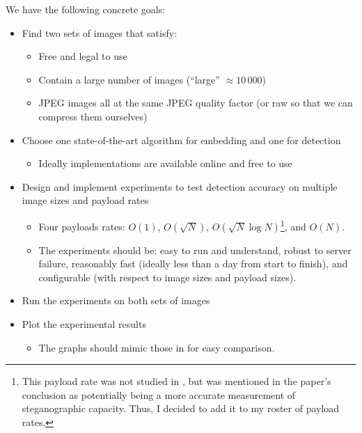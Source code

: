 \documentclass[11pt,a4paper,twoside,openright]{report}
\begin{document}
We have the following concrete goals:
\begin{itemize}

	\item Find two sets of images that satisfy:
		\begin{itemize}
			\item Free and legal to use
			\item Contain a large number of images (``large'' $\approx 10\,000$)
			\item JPEG images all at the same JPEG quality factor (or raw so that we can compress them ourselves)
		\end{itemize}

	\item Choose one state-of-the-art algorithm for embedding and one for detection
		\begin{itemize}
			\item Ideally implementations are available online and free to use
		\end{itemize}

	\item Design and implement experiments to test detection accuracy on multiple image sizes and payload rates
		\begin{itemize}
			\item Four payloads rates: $O(1)$, $O(\sqrt{N})$, $O(\sqrt{N} \log{N})$\footnote{This payload rate was not studied in \cite{2008-paper}, but was mentioned in the paper's conclusion as potentially being a more accurate measurement of steganographic capacity. Thus, I decided to add it to my roster of payload rates.}, and $O(N)$.
			\item The experiments should be: easy to run and understand, robust to server failure, reasonably fast (ideally less than a day from start to finish), and configurable (with respect to image sizes and payload sizes).
		\end{itemize}

	\item Run the experiments on both sets of images
	
	\item Plot the experimental results
		\begin{itemize}
			\item The graphs should mimic those in \cite{2008-paper} for easy comparison.
		\end{itemize}

\end{itemize}
\end{document}
